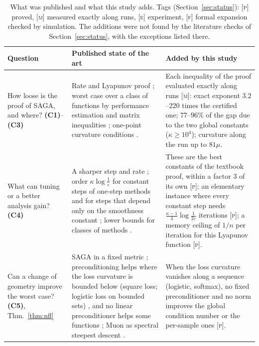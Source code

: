 \documentclass[10pt]{article}
\newcommand{\finding}[1]{\textbf{(#1)}}
\newcommand{\nat}[1]{\textsc{[#1]}}
\begin{document}
\begin{table}[t]
\caption{What was published and what this study adds. Tags (Section~\ref{sec:status}): \nat{p} proved, \nat{m}
measured exactly along runs, \nat{e} experiment, \nat{f} formal expansion checked by simulation. The additions were not
found by the literature checks of Section~\ref{sec:status}, with the exceptions listed there.}\label{tab:sota}
\centering\footnotesize
\renewcommand{\arraystretch}{1.1}
\begin{tabularx}{\textwidth}{@{}>{\raggedright\arraybackslash}p{}YY@{}}
\toprule
Question & Published state of the art & Added by this study \\
\midrule
How loose is the proof of SAGA, and where? \finding{C1}--\finding{C3} &
Rate and Lyapunov proof \cite{defazio2014saga,bach2024learning}; worst case over a class of functions by performance
estimation and matrix inequalities \cite{taylor2017smooth,hu2017unified}; one-point curvature conditions
\cite{zhang2013gradient}. &
Each inequality of the proof evaluated exactly along runs \nat{m}: exact exponent $3.2$--$220$ times the certified
one; $77$--$96\%$ of the gap due to the two global constants ($\kappa\ge10^4$); curvature along the run up to
$81\mu$. \\
What can tuning or a better analysis gain? \finding{C4} &
A sharper step and rate \cite{hofmann2015variance}; order $\kappa\log\frac1\varepsilon$ for constant steps of one-step
methods \cite{arjevani2016lower} and for steps that depend only on the smoothness constant \cite{arjevani2016iteration}; lower bounds for classes of methods
\cite{lan2018optimal,woodworth2016tight}. &
These are the best constants of the textbook proof, within a factor $3$ of its own \nat{p}; an elementary instance
where every constant step needs $\frac{\kappa-1}4\log\frac1{2\varepsilon}$ iterations \nat{p}; a memory ceiling of
$1/n$ per iteration for this Lyapunov function \nat{p}. \\
Can a change of geometry improve the worst case? \finding{C5}, Thm.~\ref{thm:nfl} &
SAGA in a fixed metric \cite{dragomir2021fast,kolte2015accelerating}; preconditioning helps where the loss curvature
is bounded below (square loss; logistic loss on bounded sets) \cite{yang2014data,gonen2016solving}, and no linear
preconditioner helps some functions \cite{hird2025quantifying}; Muon as spectral steepest descent
\cite{bernstein2024old}. &
When the loss curvature vanishes along a sequence (logistic, softmax), no fixed preconditioner and no norm improves
the global condition number or the per-sample ones \nat{p}. \\

\end{tabularx}
\end{table}
\end{document}
